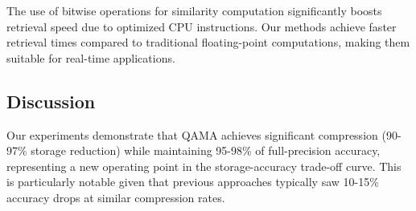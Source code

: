 \begin{table}[h]
    \centering
    \caption{Storage comparison for different embedding formats (768-dimensional vector), showing storage savings, relative performance accuracy, and computational efficiency. The ``Rel. FLOPS'' and ``Wall Clock Timing'' columns compare each method against FP32 = 1.0×, where lower numbers indicate decreased performance.}
    \label{tab:storage_comparison}
\end{table}

The use of bitwise operations for similarity computation significantly boosts retrieval speed due to optimized CPU instructions. Our methods achieve faster retrieval times compared to traditional floating-point computations, making them suitable for real-time applications.

\subsection{Discussion}
Our experiments demonstrate that QAMA achieves significant compression (90-97\% storage reduction) while maintaining 95-98\% of full-precision accuracy, representing a new operating point in the storage-accuracy trade-off curve. This is particularly notable given that previous approaches typically saw 10-15\% accuracy drops at similar compression rates.

